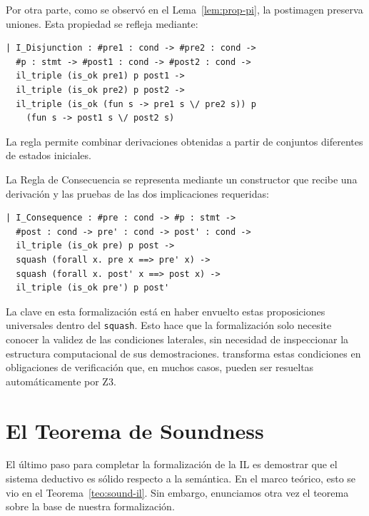 \documentclass[a4paper,	11pt]{report}
\newif\ifdraft\drafttrue
\newcommand{\comm}[3]{\ifdraft{{\color{#1}[#2: #3]}}\fi}
\newcommand{\guido}[1]{\comm{blue}{Guido}{#1}}
\begin{document}
Por otra parte,
como se observó en el Lema~\ref{lem:prop-pi},
la postimagen preserva uniones.
Esta propiedad se refleja mediante:

\begin{lstlisting}
| I_Disjunction : #pre1 : cond -> #pre2 : cond ->
  #p : stmt -> #post1 : cond -> #post2 : cond ->
  il_triple (is_ok pre1) p post1 ->
  il_triple (is_ok pre2) p post2 ->
  il_triple (is_ok (fun s -> pre1 s \/ pre2 s)) p
    (fun s -> post1 s \/ post2 s)
\end{lstlisting}
La regla permite combinar derivaciones obtenidas a partir de conjuntos diferentes de estados iniciales.

La Regla de Consecuencia se representa mediante un constructor que recibe una derivación
y las pruebas de las dos implicaciones requeridas:

\begin{lstlisting}
| I_Consequence : #pre : cond -> #p : stmt ->
  #post : cond -> pre' : cond -> post' : cond ->
  il_triple (is_ok pre) p post ->
  squash (forall x. pre x ==> pre' x) ->
  squash (forall x. post' x ==> post x) ->
  il_triple (is_ok pre') p post'
\end{lstlisting}

La clave en esta formalización está en haber envuelto estas proposiciones universales dentro del \lstinline|squash|.
Esto hace que la formalización solo necesite conocer la validez de las condiciones laterales,
sin necesidad de inspeccionar la estructura computacional de sus demostraciones.
\fstar{} transforma estas condiciones en obligaciones de verificación que,
en muchos casos,
pueden ser resueltas automáticamente por Z3.

\section{El Teorema de Soundness}
\label{sec:il-soundness}
El último paso para completar la formalización de la IL es demostrar que el sistema deductivo es sólido respecto a la semántica.
En el marco teórico,
esto se vio en el Teorema~\ref{teo:sound-il}.
Sin embargo,
enunciamos otra vez el teorema sobre la base de nuestra formalización.
\end{document}
